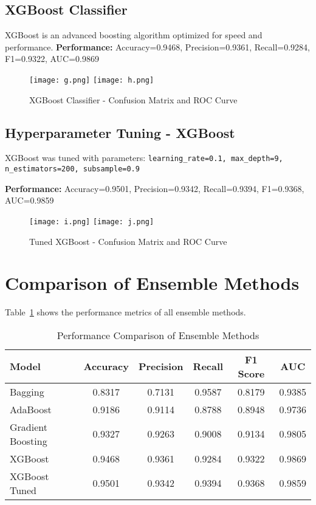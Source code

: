 \documentclass[12pt]{article}
\begin{document}
\subsection{XGBoost Classifier}
XGBoost is an advanced boosting algorithm optimized for speed and performance.  
\newline
\textbf{Performance:}  
Accuracy=0.9468, Precision=0.9361, Recall=0.9284, F1=0.9322, AUC=0.9869  

\begin{figure}[h!]
\centering
\texttt{[image: g.png]}
\texttt{[image: h.png]}
\caption{XGBoost Classifier - Confusion Matrix and ROC Curve}
\end{figure}

\subsection{Hyperparameter Tuning - XGBoost}
XGBoost was tuned with parameters:  
\texttt{learning\_rate=0.1, max\_depth=9, n\_estimators=200, subsample=0.9}  

\textbf{Performance:}  
Accuracy=0.9501, Precision=0.9342, Recall=0.9394, F1=0.9368, AUC=0.9859  

\begin{figure}[h!]
\centering
\texttt{[image: i.png]}
\texttt{[image: j.png]}
\caption{Tuned XGBoost - Confusion Matrix and ROC Curve}
\end{figure}

\section{Comparison of Ensemble Methods}
Table~\ref{tab:comparison} shows the performance metrics of all ensemble methods.  

\begin{table}[h!]
\centering
\begin{tabular}{lccccc}
\toprule
Model & Accuracy & Precision & Recall & F1 Score & AUC \\
\midrule
Bagging & 0.8317 & 0.7131 & 0.9587 & 0.8179 & 0.9385 \\
AdaBoost & 0.9186 & 0.9114 & 0.8788 & 0.8948 & 0.9736 \\
Gradient Boosting & 0.9327 & 0.9263 & 0.9008 & 0.9134 & 0.9805 \\
XGBoost & 0.9468 & 0.9361 & 0.9284 & 0.9322 & 0.9869 \\
XGBoost Tuned & 0.9501 & 0.9342 & 0.9394 & 0.9368 & 0.9859 \\
\bottomrule
\end{tabular}
\caption{Performance Comparison of Ensemble Methods}
\label{tab:comparison}
\end{table}
\end{document}

